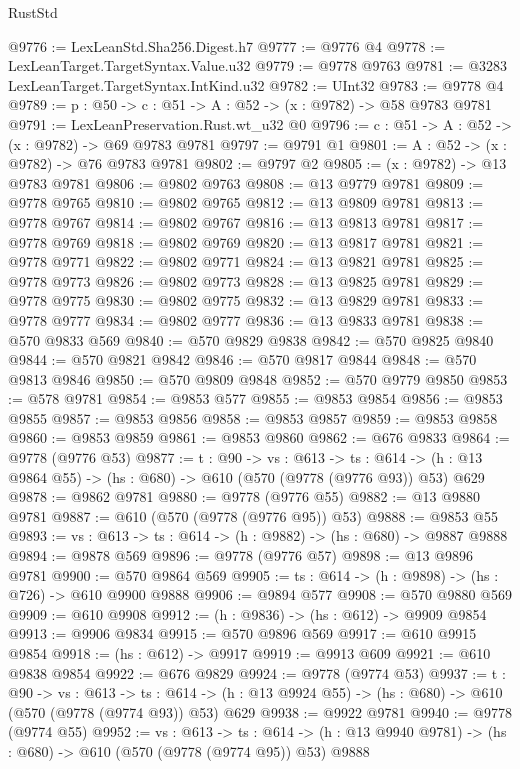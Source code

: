 \begin{lexlean}{RustStd}
\begin{coremodule}
@9776 := LexLeanStd.Sha256.Digest.h7
@9777 := @9776 @4
@9778 := LexLeanTarget.TargetSyntax.Value.u32
@9779 := @9778 @9763
@9781 := @3283 LexLeanTarget.TargetSyntax.IntKind.u32
@9782 := UInt32
@9783 := @9778 @4
@9789 := {p : @50} -> {c : @51} -> {A : @52} -> (x : @9782) -> @58 @9783 @9781
@9791 := LexLeanPreservation.Rust.wt_u32 @0
@9796 := {c : @51} -> {A : @52} -> (x : @9782) -> @69 @9783 @9781
@9797 := @9791 @1
@9801 := {A : @52} -> (x : @9782) -> @76 @9783 @9781
@9802 := @9797 @2
@9805 := (x : @9782) -> @13 @9783 @9781
@9806 := @9802 @9763
@9808 := @13 @9779 @9781
@9809 := @9778 @9765
@9810 := @9802 @9765
@9812 := @13 @9809 @9781
@9813 := @9778 @9767
@9814 := @9802 @9767
@9816 := @13 @9813 @9781
@9817 := @9778 @9769
@9818 := @9802 @9769
@9820 := @13 @9817 @9781
@9821 := @9778 @9771
@9822 := @9802 @9771
@9824 := @13 @9821 @9781
@9825 := @9778 @9773
@9826 := @9802 @9773
@9828 := @13 @9825 @9781
@9829 := @9778 @9775
@9830 := @9802 @9775
@9832 := @13 @9829 @9781
@9833 := @9778 @9777
@9834 := @9802 @9777
@9836 := @13 @9833 @9781
@9838 := @570 @9833 @569
@9840 := @570 @9829 @9838
@9842 := @570 @9825 @9840
@9844 := @570 @9821 @9842
@9846 := @570 @9817 @9844
@9848 := @570 @9813 @9846
@9850 := @570 @9809 @9848
@9852 := @570 @9779 @9850
@9853 := @578 @9781
@9854 := @9853 @577
@9855 := @9853 @9854
@9856 := @9853 @9855
@9857 := @9853 @9856
@9858 := @9853 @9857
@9859 := @9853 @9858
@9860 := @9853 @9859
@9861 := @9853 @9860
@9862 := @676 @9833
@9864 := @9778 (@9776 @53)
@9877 := {t : @90} ->
  {vs : @613} ->
  {ts : @614} -> (h : @13 @9864 @55) -> (hs : @680) -> @610 (@570 (@9778 (@9776 @93)) @53) @629
@9878 := @9862 @9781
@9880 := @9778 (@9776 @55)
@9882 := @13 @9880 @9781
@9887 := @610 (@570 (@9778 (@9776 @95)) @53)
@9888 := @9853 @55
@9893 := {vs : @613} -> {ts : @614} -> (h : @9882) -> (hs : @680) -> @9887 @9888
@9894 := @9878 @569
@9896 := @9778 (@9776 @57)
@9898 := @13 @9896 @9781
@9900 := @570 @9864 @569
@9905 := {ts : @614} -> (h : @9898) -> (hs : @726) -> @610 @9900 @9888
@9906 := @9894 @577
@9908 := @570 @9880 @569
@9909 := @610 @9908
@9912 := (h : @9836) -> (hs : @612) -> @9909 @9854
@9913 := @9906 @9834
@9915 := @570 @9896 @569
@9917 := @610 @9915 @9854
@9918 := (hs : @612) -> @9917
@9919 := @9913 @609
@9921 := @610 @9838 @9854
@9922 := @676 @9829
@9924 := @9778 (@9774 @53)
@9937 := {t : @90} ->
  {vs : @613} ->
  {ts : @614} -> (h : @13 @9924 @55) -> (hs : @680) -> @610 (@570 (@9778 (@9774 @93)) @53) @629
@9938 := @9922 @9781
@9940 := @9778 (@9774 @55)
@9952 := {vs : @613} ->
  {ts : @614} -> (h : @13 @9940 @9781) -> (hs : @680) -> @610 (@570 (@9778 (@9774 @95)) @53) @9888

\end{coremodule}
\end{lexlean}
